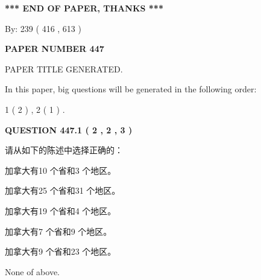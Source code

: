 \documentclass{ctexart}
\begin{document}
   
   
   
\vspace{1.0in} 
{\textbf{\large{ *** END OF PAPER, THANKS *** }}} 
   
   
\hspace{1.0in} By: 
 239 ( 416 ,  613 )
   
   
   
   
\newpage 
\setcounter{page}{ 
   447001 } 
   
   
   
   
 {\textbf{ \Large{ PAPER NUMBER  447  }}}
   
   
\vspace{0.2in}
   
   
   
   
   
   
   
   
 \vspace{0.2in}
 
 
 
 
   
   
 PAPER TITLE GENERATED.
   
   
   
\vspace{0.2in}
   
In this paper, big questions will be generated in the following order: 
   
   
   1 ( 2 )
 ,
   2 ( 1 )
 .
  
\vspace{0.2in}
  
{\textbf{\Large{QUESTION
447.1 
 ( 2 , 2 , 3 )
}}}
  
  
请从如下的陈述中选择正确的：
 
 
加拿大有10 个省和3 个地区。
 
 
加拿大有25 个省和31 个地区。
 
 
加拿大有19 个省和4 个地区。
 
 
加拿大有7 个省和9 个地区。
 
 
加拿大有9 个省和23 个地区。
 
 
 None of above.
 
 
\noindent{}
 
\end{document}
